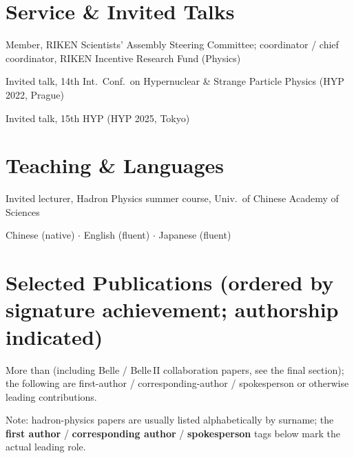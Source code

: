 \documentclass[a4paper,11pt,fontset=none]{ctexart}
\newcommand{\cvrow}[2]{%
  \noindent\makebox[2.7cm][l]{\textcolor{impblue}{\small\bfseries #1}}%
  \parbox[t]{\dimexpr\linewidth-2.8cm\relax}{#2}\par\vspace{3pt}}
\begin{document}
\begin{minipage}[t]{0.52\linewidth}
\section{Service \& Invited Talks}
\cvrow{2019--2021}{Member, RIKEN Scientists' Assembly Steering Committee; coordinator / chief coordinator, RIKEN Incentive Research Fund (Physics)}
\cvrow{2022}{Invited talk, 14th Int.\ Conf.\ on Hypernuclear \& Strange Particle Physics (HYP 2022, Prague)}
\cvrow{2025}{Invited talk, 15th HYP (HYP 2025, Tokyo)}
\end{minipage}\hfill
\begin{minipage}[t]{0.44\linewidth}
\section{Teaching \& Languages}
\cvrow{2018/23/24}{Invited lecturer, Hadron Physics summer course, Univ.\ of Chinese Academy of Sciences}
\cvrow{Languages}{Chinese (native) $\cdot$ English (fluent) $\cdot$ Japanese (fluent)}
\end{minipage}

\section{Selected Publications \normalfont\small (ordered by signature achievement; authorship indicated)}

{\small More than  (including Belle / Belle\,II collaboration papers, see the final section); the following are first-author / corresponding-author / spokesperson or otherwise leading contributions.}

{\small\color{impgray} Note: hadron-physics papers are usually listed alphabetically by surname; the \textbf{first author} / \textbf{corresponding author} / \textbf{spokesperson} tags below mark the actual leading role.}
\end{document}
